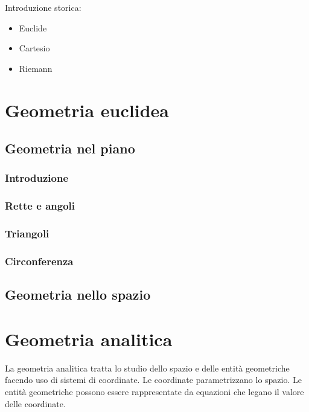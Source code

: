 
Introduzione storica:
\begin{itemize}
  \item Euclide
  \item Cartesio
  \item Riemann
\end{itemize}

\chapter{Geometria euclidea}\label{ch:geometry-euclidean}
\section{Geometria nel piano}
\subsection{Introduzione}
\subsection{Rette e angoli}
\subsection{Triangoli}
\subsection{Circonferenza}

\section{Geometria nello spazio}

\chapter{Geometria analitica}\label{ch:geometry-analytical}
La geometria analitica tratta lo studio dello spazio e delle entità geometriche facendo uso di sistemi di coordinate. Le coordinate parametrizzano lo spazio. Le entità geometriche possono essere rappresentate da equazioni che legano il valore delle coordinate.

